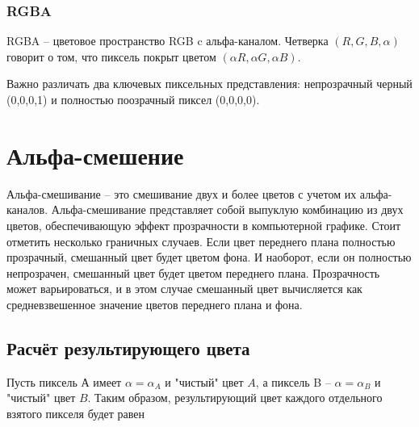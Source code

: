 \subsubsection{RGBA}
RGBA -- цветовое пространство RGB c альфа-каналом. Четверка $(R, G, B, \alpha)$ говорит о том, что пиксель покрыт цветом $(\alpha R, \alpha G, \alpha B)$. 

\begin{figure}[ht!]
\end{figure}

Важно различать два ключевых пиксельных представления:
непрозрачный черный  (0,0,0,1) и полностью поозрачный пиксел  (0,0,0,0).


\section{Альфа-смешение}
Альфа-смешивание -- это смешивание двух и более цветов с учетом их альфа-каналов. Альфа-смешивание представляет собой выпуклую комбинацию из двух цветов, обеспечивающую эффект прозрачности в компьютерной графике. Стоит отметить несколько граничных случаев. Если цвет переднего плана полностью прозрачный, смешанный цвет будет цветом фона. И наоборот, если он полностью непрозрачен, смешанный цвет будет цветом переднего плана.
Прозрачность может варьироваться, и в этом случае смешанный цвет вычисляется как средневзвешенное значение цветов переднего плана и фона.

\subsection{Расчёт результирующего цвета}
Пусть пиксель А имеет $\alpha = \alpha_{A}$ и "чистый" цвет $A$, а пиксель B  -- $\alpha = \alpha_{B}$ и "чистый" цвет $B$. Таким образом,  результирующий цвет каждого отдельного взятого пикселя будет равен

